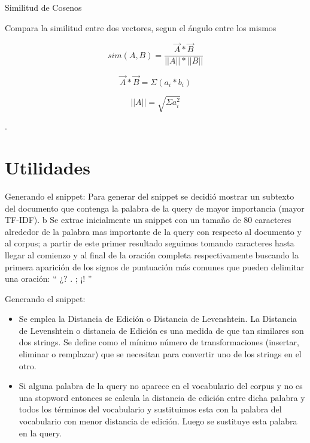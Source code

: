 \documentclass{beamer}
\begin{document}
\begin{frame}{Similitud de Cosenos}
	
		Compara la similitud entre dos vectores, segun el ángulo entre los mismos
		\pause
		\begin{center}
			\begin{equation}
				sim(A, B) = \frac{\overrightarrow{A} * \overrightarrow{B}}{||A|| * ||B||} 
			\end{equation}
		\end{center}
		\pause
		\begin{center}
			\begin{equation}
				\overrightarrow{A} * \overrightarrow{B} = \Sigma(a_i * b_i)
				\tag*{Producto Vectorial}
			\end{equation}
		\end{center}
		\pause
		\begin{center}
			\begin{equation}
				\tag{Norma de un vector}
				||A|| = \sqrt{\Sigma a_i^2}
			\end{equation}
		\end{center}.
	
\end{frame}

\section{Utilidades}\label{utilites}
\begin{frame}{Generando el snippet:}
	Para generar del snippet se decidió mostrar un subtexto del documento que contenga la palabra
	de la query de mayor importancia (mayor TF-IDF). b Se extrae inicialmente un snippet con un
	tamaño de 80 caracteres alrededor de la palabra mas importante de la query con respecto al
	documento y al corpus; a partir de este primer resultado seguimos tomando caracteres hasta
	llegar al comienzo y al final de la oración completa respectivamente buscando la primera
	aparición de los signos de puntuación más comunes que pueden delimitar una oración: “ ¿? .
	; ¡! ”
\end{frame}

\begin{frame}{Generando el snippet:}
\begin{itemize}
	\item Se emplea la Distancia de Edición o Distancia de Levenshtein. 
	La Distancia de Levenshtein o distancia de Edición es una medida de que tan similares son dos
	strings. Se define como el mínimo número de transformaciones (insertar, eliminar o remplazar)
	que se necesitan para convertir uno de los strings en el otro.
	\pause
	\item Si alguna palabra de la query no aparece en el vocabulario del corpus y no es una
	stopword entonces se calcula la distancia de edición entre dicha palabra y todos los términos
	del vocabulario y sustituimos esta con la palabra del vocabulario con menor distancia de edición.
	Luego se sustituye esta palabra en la query.
\end{itemize}
\end{frame}
\end{document}
